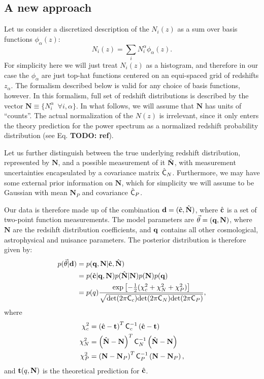 \documentclass[a4paper,11pt]{article}
\newcommand{\todo}[1]{{\bf TODO: #1}}
\newcommand{\vN}{\mathbf{N}}
\begin{document}
    \subsection{A new approach}\label{ssec:theory.nz_new}
      Let us consider a discretized description of the $N_i(z)$ as a sum over basis functions $\phi_\alpha(z)$:
      \begin{equation}
        N_i(z)=\sum_i N^\alpha_i\phi_\alpha(z).
      \end{equation}
      For simplicity here we will just treat $N_i(z)$ as a histogram, and therefore in our case the $\phi_\alpha$ are just top-hat functions centered on an equi-spaced grid of redshifts $z_\alpha$. The formalism described below is valid for any choice of basis functions, however. In this formalism, full set of redshift distributions is described by the vector $\vN\equiv\{N^\alpha_i\,\,\,\forall i,\alpha\}$. In what follows, we will assume that $\vN$ has units of ``counts''. The actual normalization of the $N(z)$ is irrelevant, since it only enters the theory prediction for the power spectrum as a normalized redshift probability distribution (see Eq. \todo{ref}).

      Let us further distinguish between the true underlying redshift distribution, represented by $\vN$, and a possible measurement of it $\hat{\bf N}$, with measurement uncertainties encapsulated by a covariance matrix $\hat{\sf C}_N$. Furthermore, we may have some external prior information on $\vN$, which for simplicity we will assume to be Gaussian with mean $\vN_P$ and covariance $\hat{\sf C}_P$.
      
      Our data is therefore made up of the combination ${\bf d}=(\hat{\bf c},\hat{\bf N})$, where $\hat{\bf c}$ is a set of two-point function measurements. The model parameters are $\vec{\theta}=({\bf q},\vN)$, where $\vN$ are the redsihft distribution coefficients, and ${\bf q}$ contains all other cosmological, astrophysical and nuisance parameters. The posterior distribution is therefore given by:
      \begin{align}
        p(\vec{\theta}|{\bf d})
        &=p({\bf q},\vN|\hat{\bf c},\hat{\bf N})\\\label{eq:posterior_full}
        &=p(\hat{\bf c}|{\bf q},\vN)p(\hat{\bf N}|\vN)p(\vN)p({\bf q})\\
        &=p(q)\frac{\exp\left[-\frac{1}{2}(\chi^2_c+\chi^2_N+\chi^2_P)\right]}{\sqrt{{\rm det}(2\pi{\sf C}_c){\rm det}(2\pi{\sf C}_N){\rm det}(2\pi{\sf C}_P)}},
      \end{align}
      where
      \begin{align}
        \chi^2_c&=\left(\hat{\bf c}-{\bf t}\right)^T{\sf C}_c^{-1}\left(\hat{\bf c}-{\bf t}\right)\\
        \chi^2_N&=\left(\hat{\bf N}-\vN\right)^T{\sf C}_N^{-1}\left(\hat{\bf N}-\vN\right)\\
        \chi^2_P&=\left(\vN-\vN_P\right)^T{\sf C}_P^{-1}\left(\vN-\vN_P\right),
      \end{align}
      and ${\bf t}(q,\vN)$ is the theoretical prediction for $\hat{\bf c}$.
      
\end{document}
